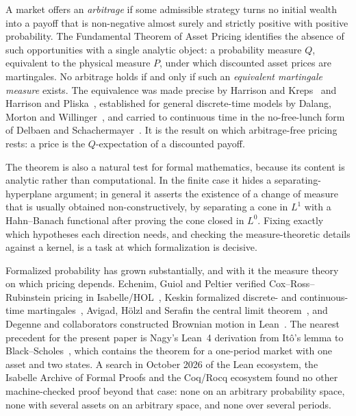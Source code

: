 \documentclass[11pt]{article}
\begin{document}
A market offers an \emph{arbitrage} if some admissible strategy turns no initial wealth into a payoff
that is non-negative almost surely and strictly positive with positive probability. The Fundamental
Theorem of Asset Pricing identifies the absence of such opportunities with a single analytic object: a
probability measure $Q$, equivalent to the physical measure $P$, under which discounted asset prices
are martingales. No arbitrage holds if and only if such an \emph{equivalent martingale measure}
exists. The equivalence was made precise by Harrison and Kreps~\cite{HarrisonKreps1979} and Harrison
and Pliska~\cite{HarrisonPliska1981}, established for general discrete-time models by Dalang, Morton
and Willinger~\cite{DMW1990}, and carried to continuous time in the no-free-lunch form of Delbaen and
Schachermayer~\cite{DelbaenSchachermayer1994}. It is the result on which arbitrage-free pricing rests:
a price is the $Q$-expectation of a discounted payoff.

The theorem is also a natural test for formal mathematics, because its content is analytic rather than
computational. In the finite case it hides a separating-hyperplane argument; in general it asserts the
existence of a change of measure that is usually obtained non-constructively, by separating a cone in
$L^1$ with a Hahn--Banach functional after proving the cone closed in $L^0$. Fixing exactly which
hypotheses each direction needs, and checking the measure-theoretic details against a kernel, is a task
at which formalization is decisive.

Formalized probability has grown substantially, and with it the measure theory on which pricing
depends. Echenim, Guiol and Peltier verified Cox--Ross--Rubinstein pricing in
Isabelle/HOL~\cite{EchenimGuiolPeltier2020}, Keskin formalized discrete- and continuous-time
martingales~\cite{Keskin2023}, Avigad, H\"olzl and Serafin the central limit
theorem~\cite{AvigadHolzlSerafin2017}, and Degenne and collaborators constructed Brownian motion in
Lean~\cite{DegenneEtAl2025,BrownianMotionRepo}. The nearest precedent for the present paper is
Nagy's Lean~4 derivation from It\^o's lemma to Black--Scholes~\cite{Nagy2026}, which contains the
theorem for a one-period market with one asset and two states. A search in October 2026 of the Lean
ecosystem, the Isabelle Archive of Formal Proofs and the Coq/Rocq ecosystem found no other machine-checked
proof beyond that case: none on an arbitrary probability space, none with several assets on an
arbitrary space, and none over several periods.
\end{document}
